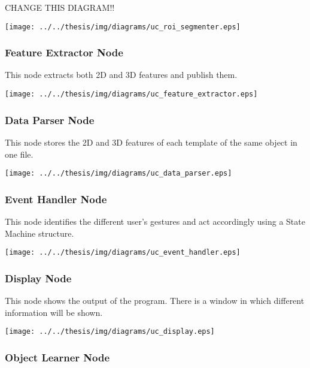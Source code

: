 \documentclass{article}
\begin{document}
\begin{huge}
CHANGE THIS DIAGRAM!!
\end{huge}

\begin{center}
	\texttt{[image: ../../thesis/img/diagrams/uc\_roi\_segmenter.eps]}
\end{center}

\subsubsection{Feature Extractor Node}
This node extracts both 2D and 3D features and publish them. 

\begin{center}
	\texttt{[image: ../../thesis/img/diagrams/uc\_feature\_extractor.eps]}
\end{center}


\subsubsection{Data Parser Node}
This node stores the 2D and 3D features of each template of the same object in one file. 
\begin{center}
	\texttt{[image: ../../thesis/img/diagrams/uc\_data\_parser.eps]}
\end{center}


\subsubsection{Event Handler Node}
	This node identifies the different user's gestures and act accordingly using a State Machine structure. 
	\begin{center}
		\texttt{[image: ../../thesis/img/diagrams/uc\_event\_handler.eps]}
	\end{center}
	
\subsubsection{Display Node}
This node shows the output of the program. There is a window in which different information will be shown. 
	\begin{center}
		\texttt{[image: ../../thesis/img/diagrams/uc\_display.eps]}
	\end{center}
	
\subsubsection{Object Learner Node}
\end{document}
